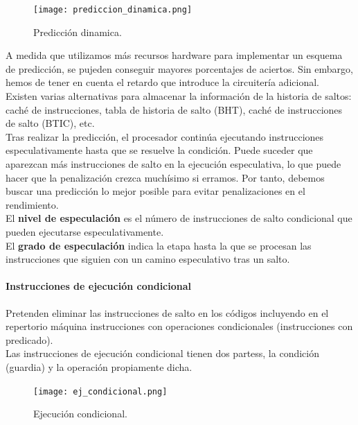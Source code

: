 \documentclass[12pt,spanish]{article}
\begin{document}
\begin{figure}[H]
\centering
\texttt{[image: prediccion\_dinamica.png]}
\caption{Predicción dinamica.}
\end{figure}


A medida que utilizamos más recursos hardware para implementar un esquema de predicción, se pujeden conseguir mayores porcentajes de aciertos. Sin embargo, hemos de tener en cuenta el retardo que introduce la circuitería adicional. \\

Existen varias alternativas para almacenar la información de la historia de saltos: caché de instrucciones, tabla de historia de salto (BHT), caché de instrucciones de salto (BTIC), etc.
\\

Tras realizar la predicción, el procesador continúa ejecutando instrucciones especulativamente hasta que se resuelve la condición. Puede suceder que aparezcan más instrucciones de salto en la ejecución especulativa, lo que puede hacer que la penalización crezca muchísimo si erramos. Por tanto, debemos buscar una predicción lo mejor posible para evitar penalizaciones en el rendimiento.\\

El \textbf{nivel de especulación} es el número de instrucciones de salto condicional que pueden ejecutarse especulativamente.\\

El \textbf{grado de especulación} indica la etapa hasta la que se procesan las instrucciones que siguien con un camino especulativo tras un salto.\\


\paragraph{Instrucciones de ejecución condicional\\}

Pretenden eliminar las instrucciones de salto en los códigos incluyendo en el repertorio máquina instrucciones con operaciones condicionales (instrucciones con predicado).\\

Las instrucciones de ejecución condicional tienen dos partess, la condición (guardia) y la operación propiamente dicha.


\begin{figure}[H]
\centering
\texttt{[image: ej\_condicional.png]}
\caption{Ejecución condicional.}
\end{figure}
\end{document}
